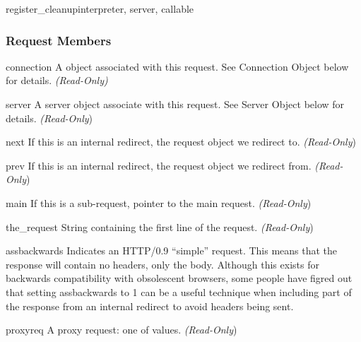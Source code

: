 \begin{funcdesc}{register_cleanup}{interpreter, server, callable}
\subsubsection{Request Members\label{pyapi-mprequest-mem}}

\begin{memberdesc}[request]{connection}
  A  object associated with this request. See
  Connection Object below for details.
  \emph{(Read-Only)}
\end{memberdesc}

\begin{memberdesc}[request]{server}
  A server object associate with this request. See Server Object below
  for details.
  \emph{(Read-Only})
\end{memberdesc}

\begin{memberdesc}[request]{next}
  If this is an internal redirect, the request object we redirect to. 
  \emph{(Read-Only})
\end{memberdesc}

\begin{memberdesc}[request]{prev}
  If this is an internal redirect, the request object we redirect from.
  \emph{(Read-Only})
\end{memberdesc}

\begin{memberdesc}[request]{main}
  If this is a sub-request, pointer to the main request. 
  \emph{(Read-Only})
\end{memberdesc}

\begin{memberdesc}[request]{the_request}
  String containing the first line of the request.
  \emph{(Read-Only})
\end{memberdesc}

\begin{memberdesc}[request]{assbackwards}
  Indicates an HTTP/0.9 ``simple'' request. This means that the
  response will contain no headers, only the body. Although this
  exists for backwards compatibility with obsolescent browsers, some
  people have figred out that setting assbackwards to 1 can be a
  useful technique when including part of the response from an
  internal redirect to avoid headers being sent.
\end{memberdesc}

\begin{memberdesc}[request]{proxyreq}
  A proxy request: one of  values.
  \emph{(Read-Only})
\end{memberdesc}


\end{funcdesc}
